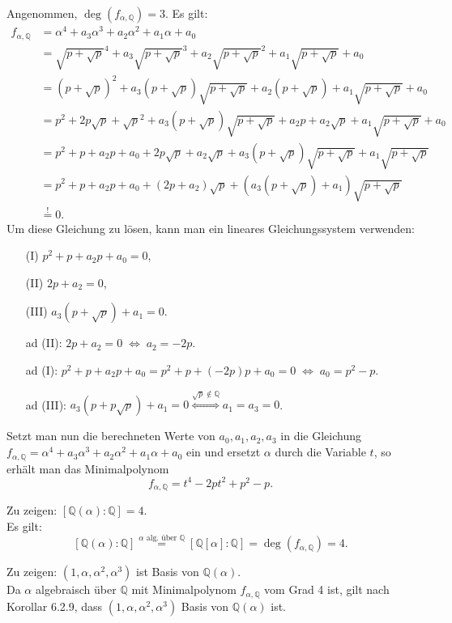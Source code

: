 \documentclass[12pt]{article}
\newcommand{\gdw}{\;\Longleftrightarrow\;}
\newcommand{\grad}{\operatorname{deg}}
\begin{document}
\begin{enumerate}
	Angenommen, $\grad(f_{\alpha,\mathbb{Q}})=3$. Es gilt:
	\begin{align*}
		f_{\alpha,\mathbb{Q}}&=\alpha^4+a_3\alpha^3+a_2\alpha^2+a_1\alpha+a_0 \\
		&=\sqrt{p+\sqrt{p}}^4+a_3\sqrt{p+\sqrt{p}}^3+a_2\sqrt{p+\sqrt{p}}^2+a_1\sqrt{p+\sqrt{p}}+a_0 \\
		&=(p+\sqrt{p})^2+a_3(p+\sqrt{p})\sqrt{p+\sqrt{p}}+a_2(p+\sqrt{p})+a_1\sqrt{p+\sqrt{p}}+a_0 \\
		&=p^2+2p\sqrt{p}+\sqrt{p}^2+a_3(p+\sqrt{p})\sqrt{p+\sqrt{p}}+a_2p+a_2\sqrt{p}+a_1\sqrt{p+\sqrt{p}}+a_0 \\
		&=p^2+p+a_2p+a_0+2p\sqrt{p}+a_2\sqrt{p}+a_3(p+\sqrt{p})\sqrt{p+\sqrt{p}}+a_1\sqrt{p+\sqrt{p}} \\
		&=p^2+p+a_2p+a_0+(2p+a_2)\sqrt{p}+(a_3(p+\sqrt{p})+a_1)\sqrt{p+\sqrt{p}} \\
		&\overset{!}{=}0.
	\end{align*}
	Um diese Gleichung zu lösen, kann man ein lineares Gleichungssystem verwenden:
	\begin{enumerate}
		\item[(I)] $p^2+p+a_2p+a_0=0$,
		\item[(II)] $2p+a_2=0$,
		\item[(III)] $a_3(p+\sqrt{p})+a_1=0$.
	\end{enumerate}
	\begin{enumerate}
		\item[ad (II):] $2p+a_2=0\gdw a_2=-2p$.
		\item[ad (I):] $p^2+p+a_2p+a_0=p^2+p+(-2p)p+a_0=0\gdw a_0=p^2-p$.
		\item[ad (III):] $a_3(p+p\sqrt{p})+a_1=0\overset{\sqrt{p}\notin\mathbb{Q}}{\gdw}a_1=a_3=0$.
	\end{enumerate}
	Setzt man nun die berechneten Werte von $a_0,a_1,a_2,a_3$ in die Gleichung $f_{\alpha,\mathbb{Q}}=\alpha^4+a_3\alpha^3+a_2\alpha^2+a_1\alpha+a_0$ ein und ersetzt $\alpha$ durch die Variable $t$, so erhält man das Minimalpolynom
	$$f_{\alpha,\mathbb{Q}}=t^4-2pt^2+p^2-p.$$
	
	Zu zeigen: $\left[\mathbb{Q}(\alpha):\mathbb{Q}\right]=4$. \\
	Es gilt: $$\left[\mathbb{Q}(\alpha):\mathbb{Q}\right]\overset{\alpha\text{ alg. über }\mathbb{Q}}{=}\left[\mathbb{Q}[\alpha]:\mathbb{Q}\right]=\grad(f_{\alpha,\mathbb{Q}})=4.$$
	
	Zu zeigen: $(1,\alpha,\alpha^2,\alpha^3)$ ist Basis von $\mathbb{Q}(\alpha)$. \\
	Da $\alpha$ algebraisch über $\mathbb{Q}$ mit Minimalpolynom $f_{\alpha,\mathbb{Q}}$ vom Grad 4 ist, gilt nach Korollar 6.2.9, dass $(1,\alpha,\alpha^2,\alpha^3)$ Basis von $\mathbb{Q}(\alpha)$ ist.
	

\end{enumerate}
\end{document}
